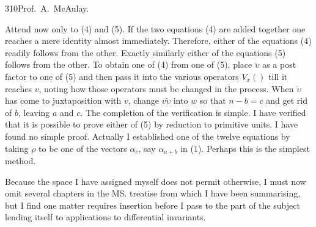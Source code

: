 \documentclass[11pt]{article}
\begin{document}
\newpage\thispagestyle{empty}\begin{center}310\hfill Prof.\ A.\ McAulay.\end{center}
Attend now only to (4) and (5). If the two equations (4) are added together one reaches a mere identity almost immediately. Therefore, either of the equations (4) readily follows from the other. Exactly similarly either of the equations (5) follows from the other. To obtain one of (4) from one of (5), place $\breve\upsilon$ as a post factor to one of (5) and then pass it into the various operators $V_x()$ till it reaches $v$, noting how those operators must be changed in the process. When $\breve\upsilon$ has come to juxtaposition with $v$, change $v\breve\upsilon$ into $w$ so that $n-b=c$ and get rid of $b$, leaving $a$ and $c$. The completion of the verification is simple. I have verified that it is possible to prove either of (5) by reduction to primitive units. I have found no simple proof. Actually I established one of the twelve equations by taking $\rho$ to be one of the vectors $\alpha_c$, say $\alpha_{a+b}$ in (1). Perhaps this is the simplest method.

\indent Because the space I have assigned myself does not permit otherwise, I must now omit several chapters in the MS. treatise from which I have been summarising, but I find one matter requires insertion before I pass to the part of the subject lending itself to applications to differential invariants.
\end{document}
